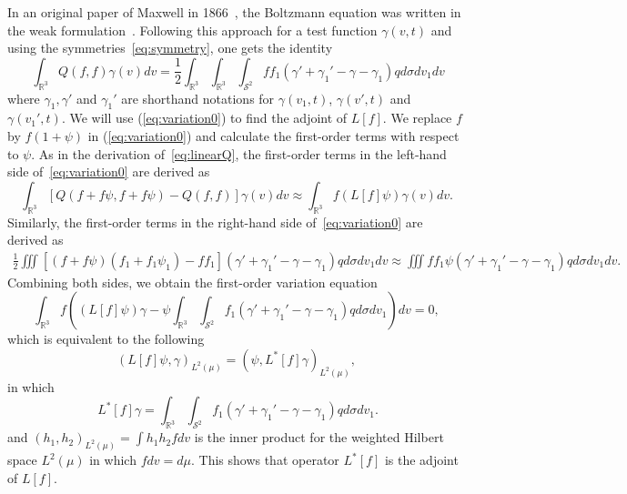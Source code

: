 \documentclass[times,final,nopreprintline]{elsarticle}
\newcommand{\bbR}{\mathbb R} \newcommand{\bbS}{\mathbb S}
\newcommand{\cS}{\mathcal S} \newcommand{\cT}{\mathcal T}
\newcommand{\Rthree}{{\bbR^3}}
\newcommand{\Stwo}{{\cS^2}}
\begin{document}
In an original paper of Maxwell in 1866~\cite{maxwell1867iv}, the Boltzmann equation was written in the weak formulation~\cite{villani2002review}. Following this approach for a test function $\gamma(v,t)$ and using the symmetries~\eqref{eq:symmetry}, one gets the identity
\begin{equation}~\label{eq:variation0}
    \int_\Rthree Q(f,f)\gamma(v) dv = \frac{1}{2} \int_\Rthree\int_\Rthree\int_\Stwo ff_1 (\gamma' + \gamma_1'-\gamma - \gamma_1)qd\sigma dv_1 dv
\end{equation}
where $\gamma_1,\gamma'$ and $\gamma_1'$ are shorthand notations for $\gamma(v_1,t)$, $\gamma(v',t)$ and $\gamma(v_1',t)$.
We will use (\ref{eq:variation0}) to find the adjoint of $L[f]$.
We  replace $f$ by $f(1+\psi)$ in (\ref{eq:variation0}) and calculate the first-order terms  with respect to $\psi$. As in the derivation of~\eqref{eq:linearQ},  the first-order terms in the left-hand side of~\eqref{eq:variation0} are derived as 
\begin{equation*}
  \int_\Rthree  [Q(f+f\psi,f+f\psi) - Q(f,f)]\gamma(v) dv \approx \int_\Rthree f(L[f] \psi)  \gamma(v) dv.
\end{equation*}   
Similarly, the first-order terms in the right-hand side of~\eqref{eq:variation0} are derived as
\begin{align*}
 \frac{1}{2} \iiint [(f+f\psi)(f_1+f_1\psi_1) - ff_1](\gamma' + \gamma_1'-\gamma - \gamma_1)qd\sigma dv_1 dv  \approx   \iiint ff_1 \psi(\gamma' + \gamma_1'-\gamma - \gamma_1)qd\sigma dv_1 dv.
\end{align*}
Combining both sides, we obtain the first-order variation equation
\begin{equation*}
    \int_\Rthree f \left((L[f] \psi) \gamma  - \psi \int_\Rthree\int_\Stwo f_1 (\gamma' + \gamma_1'-\gamma - \gamma_1)qd\sigma dv_1\right) dv=0,
\end{equation*}
which is equivalent to the following
\begin{equation*} %
    (L[f]\psi, \gamma)_{L^2(\mu)} = (\psi, L^*[f]\gamma)_{L^2(\mu)} ,
\end{equation*}
in which 
\begin{equation}~\label{eq:adj_linear_operator}
L^*[f]\gamma = \int_\Rthree\int_\Stwo f_1 (\gamma' + \gamma_1'-\gamma - \gamma_1)qd\sigma dv_1.
\end{equation}
and $(h_1,h_2)_{L^2(\mu)}  = \int h_1h_2fdv$ is the inner product for the weighted Hilbert space $L^2(\mu)$ in which $f dv = d\mu$. 
This shows that operator $L^*[f]$ 
is the adjoint of  $L[f]$. 
\end{document}
